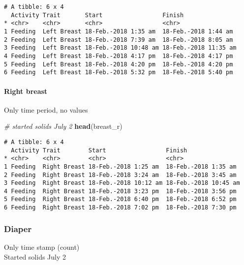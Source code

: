 \documentclass[10,portrait]{article}
\newenvironment{Shaded}{\begin{snugshade}}{\end{snugshade}}
\newcommand{\KeywordTok}[1]{\textcolor[rgb]{0.13,0.29,0.53}{\textbf{#1}}}
\newcommand{\CommentTok}[1]{\textcolor[rgb]{0.56,0.35,0.01}{\textit{#1}}}
\newcommand{\OperatorTok}[1]{\textcolor[rgb]{0.81,0.36,0.00}{\textbf{#1}}}
\newcommand{\NormalTok}[1]{#1}
\let\oldparagraph\paragraph
\renewcommand{\paragraph}[1]{\oldparagraph{#1}\mbox{}}
\begin{document}
\begin{verbatim}
# A tibble: 6 x 4
  Activity Trait       Start                 Finish               
* <chr>    <chr>       <chr>                 <chr>                
1 Feeding  Left Breast 18-Feb.-2018 1:35 am  18-Feb.-2018 1:44 am 
2 Feeding  Left Breast 18-Feb.-2018 7:39 am  18-Feb.-2018 8:05 am 
3 Feeding  Left Breast 18-Feb.-2018 10:48 am 18-Feb.-2018 11:35 am
4 Feeding  Left Breast 18-Feb.-2018 4:17 pm  18-Feb.-2018 4:17 pm 
5 Feeding  Left Breast 18-Feb.-2018 4:20 pm  18-Feb.-2018 4:20 pm 
6 Feeding  Left Breast 18-Feb.-2018 5:32 pm  18-Feb.-2018 5:40 pm 
\end{verbatim}

\paragraph{Right breast}\label{right-breast}

Only time period, no values

\begin{Shaded}
\begin{Highlighting}[]
\CommentTok{# started solids July 2    }
\KeywordTok{head}\NormalTok{(breast_r)}
\end{Highlighting}
\end{Shaded}

\begin{verbatim}
# A tibble: 6 x 4
  Activity Trait        Start                 Finish               
* <chr>    <chr>        <chr>                 <chr>                
1 Feeding  Right Breast 18-Feb.-2018 1:25 am  18-Feb.-2018 1:35 am 
2 Feeding  Right Breast 18-Feb.-2018 3:24 am  18-Feb.-2018 3:45 am 
3 Feeding  Right Breast 18-Feb.-2018 10:12 am 18-Feb.-2018 10:45 am
4 Feeding  Right Breast 18-Feb.-2018 3:23 pm  18-Feb.-2018 3:56 pm 
5 Feeding  Right Breast 18-Feb.-2018 6:40 pm  18-Feb.-2018 6:52 pm 
6 Feeding  Right Breast 18-Feb.-2018 7:02 pm  18-Feb.-2018 7:30 pm 
\end{verbatim}

\subsubsection{Diaper}\label{diaper}

Only time stamp (count)\\
Started solids July 2

\begin{Shaded}
\end{Shaded}
\end{document}

